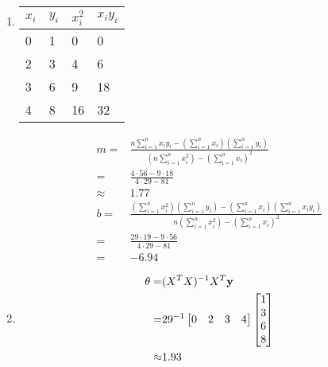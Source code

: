 \documentclass[12pt,letterpaper]{hmcpset}
\begin{document}
\begin{solution}
    \begin{enumerate}
      \item
      \begin{tabular}{l|l|| l| l }
        $x_i$ & $y_i$ & $x_i^2$ & $x_iy_i$\\
        \hline
        0 & 1 & 0 & 0\\
        2 & 3 & 4 & 6 \\
        3 & 6 & 9 & 18 \\
        4 & 8 & 16 & 32
      \end{tabular}
      \begin{align*}
        m =& \frac{n \sum_{i=1}^n x_iy_i  - \left(\sum_{i=1}^n x_i\right) \left(\sum_{i=1}^n y_i\right) }{ \left(n\sum_{i=1}^n x_i^2 \right) - \left(\sum_{i=1}^n x_i \right)^2}\\
        =& \frac{4\cdot 56 - 9\cdot 18}{ 4 \cdot 29 -  81}\\
        \approx & 1.77\\
        b =& \frac{\left(\sum_{i=1}^n x_i^2\right) \left( \sum_{i=1}^n  y_i\right)
        - \left(\sum_{i=1}^n x_i\right)\left(\sum_{i=1}^n x_iy_i\right)}{
        n\left(\sum_{i=1}^n x_i^2\right)- \left(\sum_{i=1}^n x_i\right)^2}\\
        =& \frac{ 29\cdot 19 - 9\cdot 56 }{4\cdot 29 - 81}\\
        =& -6.94
      \end{align*}

    \item \begin{align*}
    \theta =& (X^TX)^{-1}X^T{\bf y}\\
    =& 29^{-1}\begin{bmatrix}
    0&2&3 &4
  \end{bmatrix}\begin{bmatrix}
  1 \\3\\6\\8
  \end{bmatrix}\\
  \approx & 1.93
    \end{align*}
    \end{enumerate}
\end{solution}
\newpage
\end{document}
